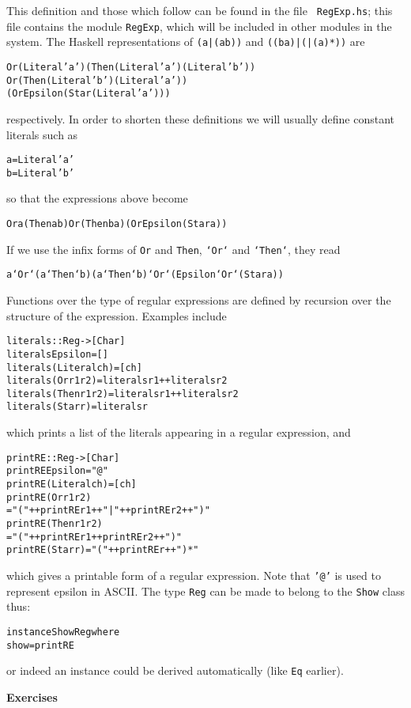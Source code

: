 \documentclass[11pt]{article}
\begin{document}
This definition and those which follow can be found in the file {\tt
RegExp.hs}; this file contains the module \texttt{RegExp}, which will be included in
other modules in the system.
The Haskell representations of {\tt (a|(ab))} and {\tt ((ba)|(\eps|(a)*))}
are
\begin{alltt}
Or (Literal 'a') (Then (Literal 'a') (Literal 'b'))
Or (Then (Literal 'b') (Literal 'a'))
   (Or Epsilon (Star (Literal 'a')))
\end{alltt}
respectively. In order to shorten these definitions we will usually define
constant literals such as
\begin{alltt}
a = Literal 'a'
b = Literal 'b'
\end{alltt}
so that the expressions above become
\begin{alltt}
Or a (Then a b)        Or (Then b a) (Or Epsilon (Star a))
\end{alltt}
If we use the infix forms of {\tt Or} and {\tt Then},
{\tt `Or`} and {\tt `Then`}, they read
\begin{alltt}
a `Or` (a `Then` b)    (a `Then` b) `Or` (Epsilon `Or` (Star a))
\end{alltt}
Functions over the type of regular expressions are defined by recursion over
the structure of the expression. Examples include
\begin{alltt}
literals :: Reg -> [Char]
\bl
literals Epsilon      = []
literals (Literal ch) = [ch]
literals (Or r1 r2)   = literals r1 ++ literals r2
literals (Then r1 r2) = literals r1 ++ literals r2
literals (Star r)     = literals r
\end{alltt}
which prints a list of the literals appearing in a regular expression, and
\begin{alltt}
printRE :: Reg -> [Char]
\bl
printRE Epsilon      = "@"
printRE (Literal ch) = [ch]
printRE (Or r1 r2)
  = "(" ++ printRE r1 ++ "|" ++ printRE r2 ++ ")"
printRE (Then r1 r2)
  = "(" ++ printRE r1 ++ printRE r2 ++ ")"
printRE (Star r) = "(" ++ printRE r ++")*"
\end{alltt}
which gives a printable form of a regular expression. Note that {\tt '@'} is
used to represent epsilon in ASCII.
The type \texttt{Reg} can be made to belong to the \texttt{Show} class thus:
\begin{alltt}
instance Show Reg where
  show = printRE
\end{alltt}
or indeed an instance could be derived automatically (like \texttt{Eq} earlier).

\medskip
\noindent
{\bf Exercises}
\end{document}
